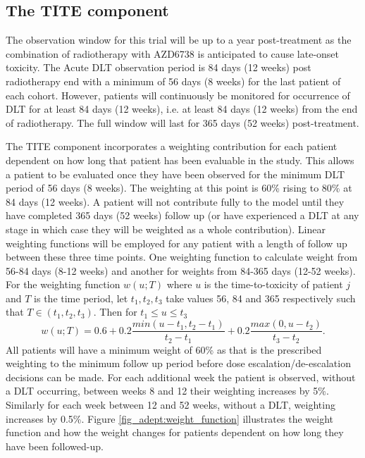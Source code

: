 \subsection{The TITE component}
\label{section2.3.2}%

The observation window for this trial will be up to a year post-treatment as the combination of radiotherapy with AZD6738 is anticipated to cause late-onset toxicity. The Acute DLT observation period is 84 days (12 weeks) post radiotherapy end with a minimum of 56 days (8 weeks) for the last patient of each cohort. However, patients will continuously be monitored for occurrence of DLT for at least 84 days (12 weeks), i.e. at least 84 days (12 weeks) from the end of radiotherapy. The full window will last for 365 days (52 weeks) post-treatment.

The TITE component incorporates a weighting contribution for each patient dependent on how long that patient has been evaluable in the study. This allows a patient to be evaluated once they have been observed for the minimum DLT period of 56 days (8 weeks). The weighting at this point is 60\% rising to 80\% at 84 days (12 weeks). A patient will not contribute fully to the model until they have completed 365 days (52 weeks) follow up (or have experienced a DLT at any stage in which case they will be weighted as a whole contribution). Linear weighting functions will be employed for any patient with a length of follow up between these three time points. One weighting function to calculate weight from 56-84 days (8-12 weeks) and another for weights from 84-365 days (12-52 weeks). For the weighting function $w(u;T)$ where $u$ is the time-to-toxicity of patient $j$ and $T$ is the time period, let $t_1, t_2, t_3$ take values 56, 84 and 365 respectively such that $T \in (t_1, t_2, t_3)$. Then for $t_1 \leq u \leq t_3$
\begin{equation}
w(u;T) = 0.6 + 0.2\frac{min(u-t_1,t_2 - t_1)}{t_2 - t_1} + 0.2\frac{max(0, u - t_2)}{t_3-t_2}.
\end{equation} 
All patients will have a minimum weight of 60\% as that is the prescribed weighting to the  minimum follow up period before dose escalation/de-escalation decisions can be made. For each additional week the patient is observed, without a DLT occurring, between weeks 8 and 12 their weighting increases by 5\%. Similarly for each week between 12 and 52 weeks, without a DLT, weighting increases by 0.5\%. Figure \ref{fig_adept:weight_function} illustrates the weight function and how the weight changes for patients dependent on how long they have been followed-up.   

